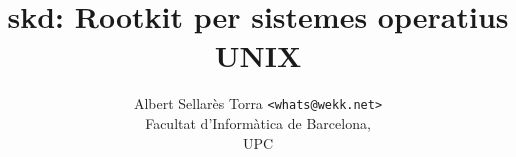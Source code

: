 \documentclass[a4paper]{report}
\author{Albert Sellarès Torra \texttt{<whats@wekk.net>}\\
		Facultat d'Informàtica de Barcelona,\\
		UPC\\}
\title{skd: Rootkit per sistemes operatius UNIX}
\begin{document}
\large




















\appendix






\end{document}
